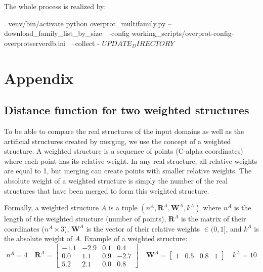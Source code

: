\documentclass{article}
\begin{document}
The whole process is realized by:

\begin{codeblock}
  . venv/bin/activate
  python  overprot_multifamily.py  --download_family_list_by_size \
      --config working_scripts/overprot-config-overprotserverdb.ini \
      --collect  -  $UPDATE_DIRECTORY                                                           $
\end{codeblock}



\section{Appendix} 

\label{sec:appendix}



\subsection{Distance function for two weighted structures}

\label{sec:appendix_ws_distance}

To be able to compare the real structures of the input domains as well as the artificial 
structures created by merging, we use the concept of a weighted structure. 
A weighted structure is a sequence of points (C-alpha coordinates)
where each point has its relative weight. 
In any real structure, all relative weights are equal to 1, 
but merging can create points with smaller relative weights.
The absolute weight of a weighted structure is simply the number of the real structures 
that have been merged to form this weighted structure.

Formally, a weighted structure \(A\) is a tuple
\( (n^A, \mathbf{R}^A, \mathbf{W}^A, k^A) \) where \(n^A\) is the length
of the weighted structure (number of points), \(\mathbf{R}^A\) is the
matrix of their coordinates (\(n^A \times 3\)), \(\mathbf{W}^A\) is the
vector of their relative weights \(\in (0,1]\), and \(k^A\) is the
absolute weight of \(A\). Example of a weighted structure:
  \[
    n^A = 4 \quad
    \mathbf{R}^A = \begin{bmatrix}-1.1&-2.9&0.1&0.4\\0.0&1.1&0.9&-2.7\\5.2&2.1&0.0&0.8\end{bmatrix} \quad
    \mathbf{W}^A = \begin{bmatrix}1&0.5&0.8&1\end{bmatrix} \quad
    k^A = 10
  \]
\end{document}
